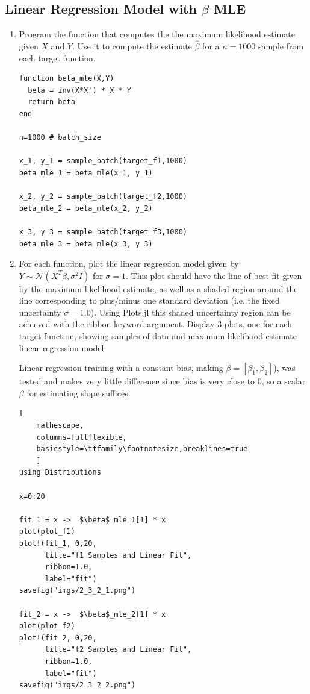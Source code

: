 \documentclass[12pt,letter]{article}
\begin{document}
\subsection{Linear Regression Model with $\beta$ MLE}

\begin{enumerate}
\item Program the function that computes the the maximum likelihood estimate given $X$ and $Y$. Use it to compute the estimate $\hat \beta$ for a $n=1000$ sample from each target function.  
\begin{verbatim}
function beta_mle(X,Y)
  beta = inv(X*X') * X * Y
  return beta
end

n=1000 # batch_size

x_1, y_1 = sample_batch(target_f1,1000)
beta_mle_1 = beta_mle(x_1, y_1)

x_2, y_2 = sample_batch(target_f2,1000)
beta_mle_2 = beta_mle(x_2, y_2)

x_3, y_3 = sample_batch(target_f3,1000)
beta_mle_3 = beta_mle(x_3, y_3)
\end{verbatim}

\item For each function, plot the linear regression model given by $Y \sim \mathcal{N}(X^T \beta, \sigma^2I)$ for $\sigma=1$. This plot should have the line of best fit given by the maximum likelihood estimate, as well as a shaded region around the line corresponding to plus/minus one standard deviation (i.e. the fixed uncertainty $\sigma = 1.0$). Using Plots.jl this shaded uncertainty region can be achieved with the ribbon keyword argument. Display 3 plots, one for each target function, showing samples of data and maximum likelihood estimate linear regression model.

  Linear regression training with a constant bias, making $\beta=[\beta_1, \beta_2]$), was tested and makes very little difference since bias is very close to 0, so a scalar $\beta$ for estimating slope suffices.
  \pagebreak
\begin{lstlisting}[
    mathescape,
    columns=fullflexible,
    basicstyle=\ttfamily\footnotesize,breaklines=true
    ]
using Distributions

x=0:20

fit_1 = x ->  $\beta$_mle_1[1] * x
plot(plot_f1)
plot!(fit_1, 0,20, 
      title="f1 Samples and Linear Fit",
      ribbon=1.0,
      label="fit")
savefig("imgs/2_3_2_1.png")

fit_2 = x ->  $\beta$_mle_2[1] * x
plot(plot_f2)
plot!(fit_2, 0,20,
      title="f2 Samples and Linear Fit",
      ribbon=1.0,
      label="fit")
savefig("imgs/2_3_2_2.png")


\end{lstlisting}
\end{enumerate}
\end{document}
